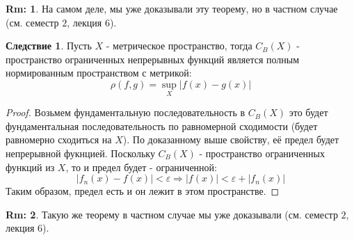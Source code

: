 \documentclass[12pt]{article}
\newcommand{\VE}{\varepsilon}
\theoremstyle{definition}
\newtheorem{rem}{Rm:}
\newtheorem{corollary}{Следствие}
\begin{document}
\begin{rem}
	На самом деле, мы уже доказывали эту теорему, но в частном случае (см. семестр $2$, лекция $6$).
\end{rem}

\begin{corollary}
	Пусть $X$ - метрическое пространство, тогда $C_B(X)$ - пространство ограниченных непрерывных функций является полным нормированным пространством с метрикой:
	$$
		\rho(f,g) = \sup\limits_{X}|f(x) - g(x)|
	$$
\end{corollary}
\begin{proof}
	Возьмем фундаментальную последовательность в $C_B(X)$ это будет фундаментальная последовательность по равномерной сходимости (будет равномерно сходиться на $X$). По доказанному выше свойству, её предел будет непрерывной фукнцией. Поскольку $C_B(X)$ - пространство ограниченных функций из $X$, то и предел будет - ограниченной:
	$$
		|f_n(x) - f(x)| < \VE \Rightarrow |f(x)| < \VE + |f_n(x)| 
	$$
	Таким образом, предел есть и он лежит в этом пространстве.
\end{proof}
\begin{rem}
	Такую же теорему в частном случае мы уже доказывали (см. семестр $2$, лекция $6$).
\end{rem}
\end{document}
